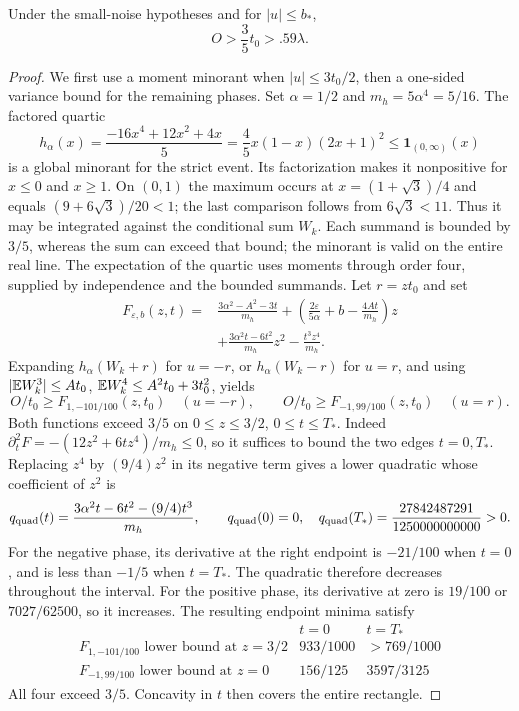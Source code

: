\begin{lemma}
\label{short:count:central-loss-lemma}
Under the small-noise hypotheses and for $|u|\le b_*$,
\begin{equation}\label{short:count:small-own}
 O>\frac35t_0>.59\lambda.
\end{equation}
\end{lemma}
\begin{proof}
We first use a moment minorant when $|u|\le3t_0/2$, then a one-sided
variance bound for the remaining phases. Set $\alpha=1/2$ and $m_h=5\alpha^4=5/16$.
The factored quartic
\begin{equation}\label{short:count:minorant}
 h_\alpha(x)=\frac{-16x^4+12x^2+4x}{5}
 =\frac45x(1-x)(2x+1)^2
 \le\mathbf1_{(0,\infty)}(x)
\end{equation}
is a global minorant for the strict event. Its factorization makes it
nonpositive for $x\le0$ and $x\ge1$. On $(0,1)$ the maximum occurs at
$x=(1+\sqrt3)/4$ and equals $(9+6\sqrt3)/20<1$; the last comparison
follows from $6\sqrt3<11$.
Thus it may be integrated against the conditional sum $W_k$. Each
summand is bounded by $3/5$, whereas the sum can exceed that bound;
the minorant is valid on the entire real line.
The expectation of the quartic uses moments through order four, supplied
by independence and the bounded summands. Let $r=zt_0$ and set
\begin{align*}
 F_{\varepsilon,b}(z,t)={}&\frac{3\alpha^2-A^2-3t}{m_h}
 +\left(\frac{2\varepsilon}{5\alpha}+b-\frac{4At}{m_h}\right)z\\
 &+\frac{3\alpha^2t-6t^2}{m_h}z^2-\frac{t^3z^4}{m_h}.
\end{align*}
Expanding $h_\alpha(W_k+r)$ for $u=-r$, or
$h_\alpha(W_k-r)$ for $u=r$, and using
$|\mathbb E W_k^3|\le At_0$, $\mathbb E W_k^4\le A^2t_0+3t_0^2$, yields
\[
 O/t_0\ge F_{1,-101/100}(z,t_0)\quad(u=-r),\qquad
 O/t_0\ge F_{-1,99/100}(z,t_0)\quad(u=r).
\]
Both functions exceed $3/5$ on $0\le z\le3/2$, $0\le t\le T_*$.
Indeed $\partial_t^2F=-(12z^2+6tz^4)/m_h\le0$, so it suffices to
bound the two edges $t=0,T_*$. Replacing $z^4$ by $(9/4)z^2$ in its
negative term gives a lower quadratic whose coefficient of $z^2$ is
\[
 q_{\rm quad}(t)=\frac{3\alpha^2t-6t^2-(9/4)t^3}{m_h},\qquad
 q_{\rm quad}(0)=0,\quad
 q_{\rm quad}(T_*)=\frac{27842487291}{1250000000000}>0.
\]
For the negative phase, its derivative at the right endpoint is
$-21/100$ when $t=0$, and is less than $-1/5$ when $t=T_*$.
The quadratic therefore decreases throughout the interval.
For the positive phase, its derivative at zero is $19/100$ or
$7027/62500$, so it increases. The resulting endpoint minima satisfy
\[
\begin{array}{c|cc}
 &t=0&t=T_*\\\hline
 F_{1,-101/100}\text{ lower bound at }z=3/2
     &933/1000&>769/1000\\
 F_{-1,99/100}\text{ lower bound at }z=0
     &156/125&3597/3125
\end{array}
\]
All four exceed $3/5$. Concavity in $t$ then covers the entire rectangle.


\end{proof}
